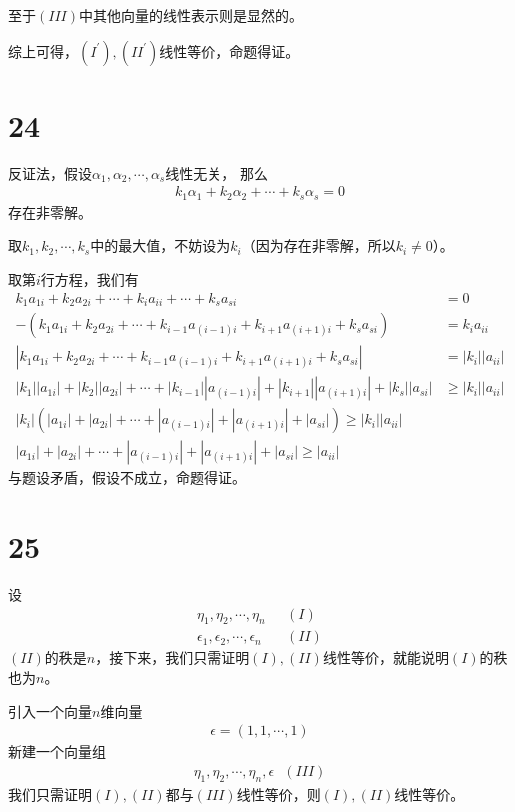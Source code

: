 \documentclass{article}
\begin{document}
至于$(III)$中其他向量的线性表示则是显然的。

综上可得，$(I^\prime), (II^\prime)$线性等价，命题得证。

\section*{24}

反证法，假设$\alpha_1, \alpha_2, \cdots, \alpha_s$线性无关，
那么
\begin{align*}
  k_1 \alpha_1 + k_2 \alpha_2 + \cdots + k_s \alpha_s = 0
\end{align*}
存在非零解。

取$k_1, k_2, \cdots, k_s$中的最大值，不妨设为$k_i$（因为存在非零解，所以$k_i \neq 0$）。

取第$i$行方程，我们有
\begin{align*}
  k_1 a_{1i} + k_2 a_{2i} + \cdots + k_ia_{ii} + \cdots + k_s a_{si}                                           & = 0                \\
  - (k_1 a_{1i} + k_2 a_{2i} + \cdots + k_{i - 1} a_{(i - 1)i} + k_{i+1} a_{(i + 1)i} + k_s a_{si})            & = k_ia_{ii}        \\
  |k_1 a_{1i} + k_2 a_{2i} + \cdots + k_{i-1} a_{(i - 1)i} + k_{i+1} a_{(i + 1)i} + k_s a_{si}|                & = |k_i||a_{ii}|    \\
  |k_1||a_{1i}| + |k_2||a_{2i}| + \cdots + |k_{i-1}||a_{(i - 1)i}| + |k_{i + 1}||a_{(i + 1)i}| + |k_s||a_{si}| & \geq |k_i||a_{ii}| \\
  |k_i|(|a_{1i}| + |a_{2i}| + \cdots + |a_{(i - 1)i}| + |a_{(i + 1)i}| + |a_{si}|) \geq |k_i||a_{ii}|                               \\
  |a_{1i}| + |a_{2i}| + \cdots + |a_{(i - 1)i}| + |a_{(i + 1)i}| + |a_{si}| \geq |a_{ii}|
\end{align*}
与题设矛盾，假设不成立，命题得证。

\section*{25}

设
\begin{align*}
  \eta_1, \eta_2, \cdots, \eta_n             & \ \ \ (I)  \\
  \epsilon_1, \epsilon_2, \cdots, \epsilon_n & \ \ \ (II)
\end{align*}
$(II)$的秩是$n$，接下来，我们只需证明$(I),(II)$线性等价，就能说明$(I)$的秩也为$n$。

引入一个向量$n$维向量
\begin{align*}
  \epsilon = (1, 1, \cdots, 1)
\end{align*}
新建一个向量组
\begin{align*}
  \eta_1, \eta_2, \cdots, \eta_n, \epsilon \ \ \ (III)
\end{align*}
我们只需证明$(I),(II)$都与$(III)$线性等价，则$(I),(II)$线性等价。
\end{document}
